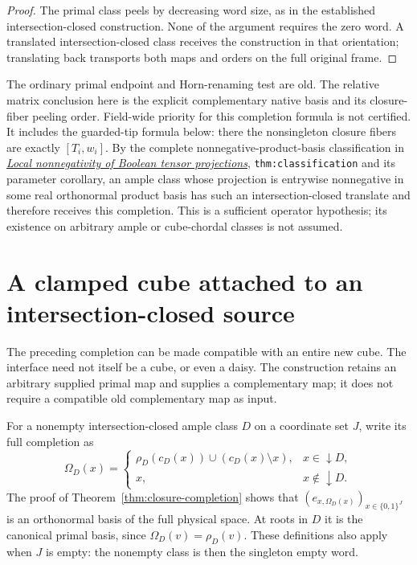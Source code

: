 \documentclass[11pt]{article}
\theoremstyle{definition}
\begin{document}
\begin{proof}
The primal class peels by decreasing word size, as in the established
intersection-closed construction. None of the argument requires the zero
word. A translated intersection-closed class receives the construction
in that orientation; translating back transports both maps and orders
on the full original frame.
\end{proof}

The ordinary primal endpoint and Horn-renaming test are old. The relative
matrix conclusion here is the explicit complementary native basis and
its closure-fiber peeling order. Field-wide priority for this completion
formula is not certified. It includes the guarded-tip formula below:
there the nonsingleton closure fibers are exactly $[T_i,w_i]$.
By the complete nonnegative-product-basis classification in
\href{../../containment-cubic-positivity/research/local_nonnegative_projections.tex}
{\emph{Local nonnegativity of Boolean tensor projections}},
\texttt{thm:classification} and its parameter corollary, an ample class
whose projection is entrywise nonnegative in some real orthonormal product
basis has such an intersection-closed translate and therefore receives
this completion. This is a sufficient operator hypothesis; its existence
on arbitrary ample or cube-chordal classes is not assumed.

\section{A clamped cube attached to an intersection-closed source}
\label{sec:horn-gluing}
The preceding completion can be made compatible with an entire new cube.
The interface need not itself be a cube, or even a daisy. The construction
retains an arbitrary supplied primal map and supplies a complementary map;
it does not require a compatible old complementary map as input.

For a nonempty intersection-closed ample class $D$ on a coordinate set $J$,
write its full completion as
\begin{equation}\label{eq:full-closure-map}
 \Omega_D(x)=
 \begin{cases}
 \rho_D(c_D(x))\cup(c_D(x)\setminus x),&x\in\downarrow D,\\
 x,&x\notin\downarrow D.
 \end{cases}
\end{equation}
The proof of Theorem~\ref{thm:closure-completion} shows that
$(e_{x,\Omega_D(x)})_{x\in\{0,1\}^J}$ is an orthonormal basis of
the full physical space. At roots in $D$ it is the canonical primal
basis, since $\Omega_D(v)=\rho_D(v)$. These definitions also apply
when $J$ is empty: the nonempty class is then the singleton empty word.
\end{document}
